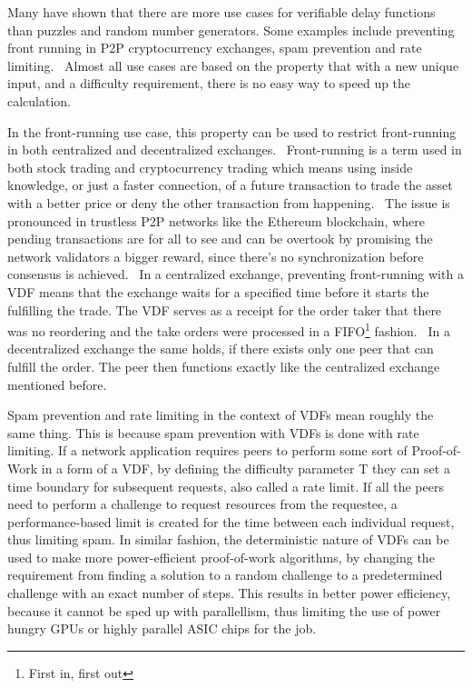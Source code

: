 Many have shown that there are more use cases for verifiable delay functions than puzzles and random number generators. Some examples include preventing front running in P2P cryptocurrency exchanges, spam prevention and rate limiting.~\cite{noauthor_undated-hk} Almost all use cases are based on the property that with a new unique input, and a difficulty requirement, there is no easy way to speed up the calculation.

In the front-running use case, this property can be used to restrict front-running in both centralized and decentralized exchanges.~\cite{Khalil2019-sl} Front-running is a term used in both stock trading and cryptocurrency trading which means using inside knowledge, or just a faster connection, of a future transaction to trade the asset with a better price or deny the other transaction from happening.~\cite{Robinson2020-ve} The issue is pronounced in trustless P2P networks like the Ethereum blockchain, where pending transactions are for all to see and can be overtook by promising the network validators a bigger reward, since there's no synchronization before consensus is achieved.~\cite{Mitchell2020-hn} In a centralized exchange, preventing front-running with a VDF means that the exchange waits for a specified time before it starts the fulfilling the trade. The VDF serves as a receipt for the order taker that there was no reordering and the take orders were processed in a FIFO\footnote{First in, first out} fashion.~\cite{Cline2020-wb} In a decentralized exchange the same holds, if there exists only one peer that can fulfill the order. The peer then functions exactly like the centralized exchange mentioned before.

Spam prevention and rate limiting in the context of VDFs mean roughly the same thing. This is because spam prevention with VDFs is done with rate limiting. If a network application requires peers to perform some sort of Proof-of-Work in a form of a VDF, by defining the difficulty parameter T they can set a time boundary for subsequent requests, also called a rate limit. If all the peers need to perform a challenge to request resources from the requestee, a performance-based limit is created for the time between each individual request, thus limiting spam. In similar fashion, the deterministic nature of VDFs can be used to make more power-efficient proof-of-work algorithms, by changing the requirement from finding a solution to a random challenge to a predetermined challenge with an exact number of steps. This results in better power efficiency, because it cannot be sped up with parallellism, thus limiting the use of power hungry GPUs or highly parallel ASIC chips for the job.

